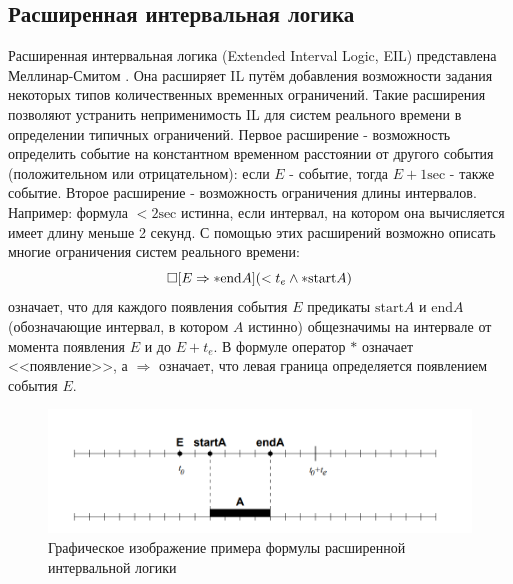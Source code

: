 		\subsection{Расширенная интервальная логика}
		Расширенная интервальная логика (Extended Interval Logic, EIL) представлена Меллинар-Смитом \cite{EIL}. 
		Она расширяет IL путём добавления возможности задания некоторых типов количественных временных ограничений.
		Такие расширения позволяют устранить неприменимость IL для систем реального времени в определении типичных ограничений.
		Первое расширение - возможность определить событие на константном временном расстоянии от другого события (положительном или отрицательном): если $ E $ - событие, тогда $ E + 1\text{sec} $ - также событие.
		Второе расширение - возможность ограничения длины интервалов.
		Например: формула $ <2\text{sec} $ истинна, если интервал, на котором она вычисляется имеет длину меньше 2 секунд.
		С помощью этих расширений возможно описать многие ограничения систем реального времени: \[\square[E\Rightarrow*\text{end}A](<t_e \land * \text{start} A) \] означает, что для каждого появления события $ E $ предикаты $ \text{start} A $ и $ \text{end} A $ (обозначающие интервал, в котором $ A $ истинно) общезначимы на интервале от момента появления $ E $ и до $ E + t_e $.
		В формуле оператор $ * $ означает <<появление>>, а $ \Rightarrow $ означает, что левая граница определяется появлением события $ E $.
		
		\begin{figure}[h]
			\centering
			\includegraphics[width=0.7\linewidth]{images/EIL}
			\caption{Графическое изображение примера формулы расширенной интервальной логики}
			\label{fig:eil}
		\end{figure}

